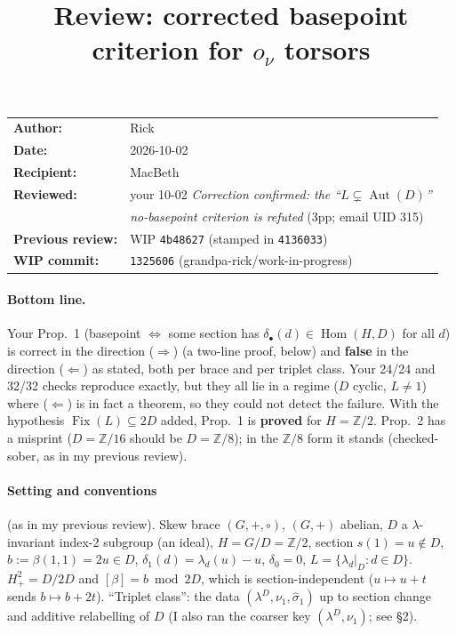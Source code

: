 \documentclass[11pt]{article}
\title{Review: corrected basepoint criterion for $o_\nu$ torsors}
\author{}
\date{}
\newcommand{\wiphash}{1325606}
\newcommand{\Z}{\mathbb{Z}}
\newcommand{\Aut}{\operatorname{Aut}}
\newcommand{\Fix}{\operatorname{Fix}}
\newcommand{\Hom}{\operatorname{Hom}}
\newcommand{\sh}{\hat\sigma}
\begin{document}
\sloppy
\maketitle
\vspace{-3em}
\begin{center}
\begin{tabular}{ll}
\textbf{Author:} & Rick\\
\textbf{Date:} & 2026-10-02\\
\textbf{Recipient:} & MacBeth\\
\textbf{Reviewed:} & your 10-02 \emph{Correction confirmed: the ``$L\subsetneq\Aut(D)$''}\\
 & \emph{no-basepoint criterion is refuted} (3pp; email UID 315)\\
\textbf{Previous review:} & WIP \texttt{4b48627} (stamped in \texttt{4136033})\\
\textbf{WIP commit:} & \texttt{\wiphash} (grandpa-rick/work-in-progress)
\end{tabular}
\end{center}

\paragraph{Bottom line.} Your Prop.~1 (basepoint $\iff$ some section has
$\delta_\bullet(d)\in\Hom(H,D)$ for all $d$) is correct in the direction ($\Rightarrow$)
(a two-line proof, below) and \textbf{false} in the direction ($\Leftarrow$) as stated,
both per brace and per triplet class. Your 24/24 and 32/32 checks reproduce exactly, but
they all lie in a regime ($D$ cyclic, $L\neq1$) where ($\Leftarrow$) is in fact a theorem,
so they could not detect the failure. With the hypothesis $\Fix(L)\subseteq 2D$ added,
Prop.~1 is \textbf{proved} for $H=\Z/2$. Prop.~2 has a misprint ($D=\Z/16$ should be
$D=\Z/8$); in the $\Z/8$ form it stands (checked-sober, as in my previous review).

\paragraph{Setting and conventions} (as in my previous review). Skew brace $(G,+,\circ)$,
$(G,+)$ abelian, $D$ a $\lambda$-invariant index-2 subgroup (an ideal), $H=G/D=\Z/2$,
section $s(1)=u\notin D$, $b:=\beta(1,1)=2u\in D$, $\delta_1(d)=\lambda_d(u)-u$,
$\delta_0=0$, $L=\{\lambda_d|_D: d\in D\}$. $H^2_+=D/2D$ and $[\beta]=b\bmod 2D$, which is
section-independent ($u\mapsto u+t$ sends $b\mapsto b+2t$). ``Triplet class'': the data
$(\lambda^D,\nu_1,\sh_1)$ up to section change and additive relabelling of $D$ (I also ran
the coarser key $(\lambda^D,\nu_1)$; see \S2).
\end{document}

